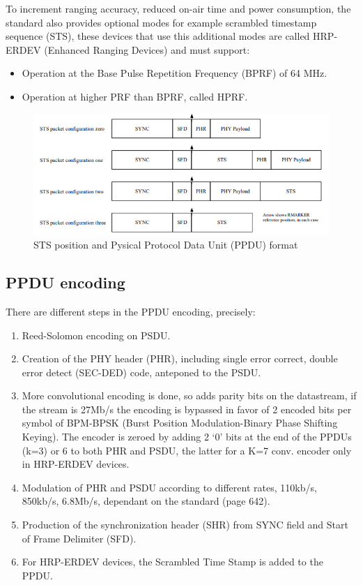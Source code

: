 \documentclass[conference]{IEEEtran}
\begin{document}
To increment ranging accuracy, reduced on-air time and power consumption, the standard
also provides optional modes for example scrambled timestamp sequence (STS), these devices
that use this additional modes are called HRP-ERDEV (Enhanced Ranging Devices) and must
support:
\begin{itemize}
  \item Operation at the Base Pulse Repetition Frequency (BPRF) of 64 MHz.
  \item Operation at higher PRF than BPRF, called HPRF.
\end{itemize}

\begin{figure}[!h]
  \centering
  \includegraphics[width=\linewidth]{STS-pak}
  \caption{STS position and Pysical Protocol Data Unit (PPDU) format}
  \label{fig:STS}
\end{figure}

\subsection{PPDU encoding}
There are different steps in the PPDU encoding, precisely:
\begin{enumerate}
  \item Reed-Solomon encoding on PSDU.
  \item Creation of the PHY header (PHR), including single error correct, double error detect
        (SEC-DED) code, anteponed to the PSDU.
  \item More convolutional encoding is done, so adds parity bits on the datastream, if the 
        stream is 27Mb/s the encoding is bypassed in favor of 2 encoded bits per symbol of 
        BPM-BPSK (Burst Position Modulation-Binary Phase Shifting Keying). The encoder is zeroed by 
        adding 2 `0' bits at the end of the PPDUs (k=3) or 6 to both PHR and PSDU, the latter for 
        a K=7 conv. encoder only in HRP-ERDEV devices.
  \item Modulation of PHR and PSDU according to different rates, 110kb/s, 850kb/s, 6.8Mb/s, 
        dependant on the standard (page 642).
  \item Production of the synchronization header (SHR) from SYNC field and Start of Frame
        Delimiter (SFD).
  \item For HRP-ERDEV devices, the Scrambled Time Stamp is added to the PPDU.
\end{enumerate}
\end{document}
